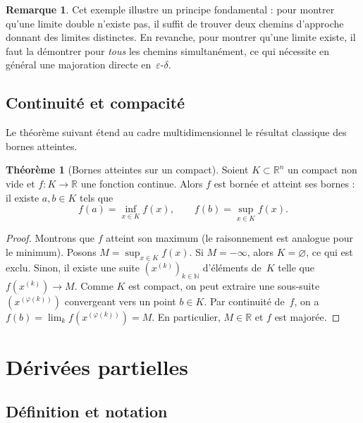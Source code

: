 \documentclass[12pt,a4paper,openany]{book}
\theoremstyle{definition}
\newtheorem{theoreme}{Théorème}[chapter]
\newtheorem{remarque}{Remarque}[chapter]
\newcommand{\N}{\mathbb{N}}
\newcommand{\R}{\mathbb{R}}
\newcommand{\eps}{\varepsilon}
\begin{document}
\begin{remarque}
  \label{rem:limites-iterees}
  Cet exemple illustre un principe fondamental : pour montrer qu'une limite double n'existe pas, il suffit de trouver deux chemins d'approche donnant des limites distinctes. En revanche, pour montrer qu'une limite existe, il faut la démontrer pour \emph{tous} les chemins simultanément, ce qui nécessite en général une majoration directe en~$\eps$-$\delta$.
\end{remarque}

\subsection{Continuité et compacité}

Le théorème suivant étend au cadre multidimensionnel le résultat classique des bornes atteintes.

\begin{theoreme}[Bornes atteintes sur un compact]
  \label{thm:bornes-atteintes-compact}
  Soient $K \subset \R^n$ un compact non vide et $f \colon K \to \R$ une fonction continue. Alors $f$ est bornée et atteint ses bornes : il existe $a, b \in K$ tels que
  \[
    f(a) = \inf_{x \in K} f(x), \qquad f(b) = \sup_{x \in K} f(x).
  \]
\end{theoreme}

\begin{proof}
  Montrons que $f$ atteint son maximum (le raisonnement est analogue pour le minimum). Posons $M = \sup_{x \in K} f(x)$. Si $M = -\infty$, alors $K = \varnothing$, ce qui est exclu. Sinon, il existe une suite $(x^{(k)})_{k \in \N}$ d'éléments de~$K$ telle que $f(x^{(k)}) \to M$. Comme $K$ est compact, on peut extraire une sous-suite $(x^{(\varphi(k))})$ convergeant vers un point $b \in K$. Par continuité de~$f$, on a $f(b) = \lim_k f(x^{(\varphi(k))}) = M$. En particulier, $M \in \R$ et $f$ est majorée.
\end{proof}

\section{Dérivées partielles}
\label{sec:derivees-partielles}

\subsection{Définition et notation}
\end{document}
